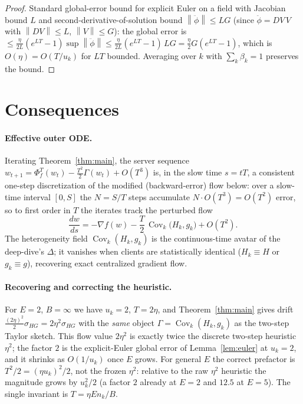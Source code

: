 \documentclass[11pt]{article}
\theoremstyle{definition}
\newcommand{\norm}[1]{\left\lVert#1\right\rVert}
\newcommand{\grad}{\nabla}
\newcommand{\Cov}{\operatorname{Cov}}
\begin{document}
\begin{proof}
Standard global-error bound for explicit Euler on a field with Jacobian bound
$L$ and second-derivative-of-solution bound $\norm{\ddot\phi}\le LG$ (since
$\ddot\phi=DV\,V$ with $\norm{DV}\le L$, $\norm{V}\le G$): the global error is
$\le \tfrac{\eta}{2L}(e^{LT}-1)\sup\norm{\ddot\phi}\le\tfrac{\eta}{2L}(e^{LT}-1)\,LG
=\tfrac{\eta}{2}G(e^{LT}-1)$, which is $O(\eta)=O(T/u_k)$ for $LT$ bounded.
Averaging over $k$ with $\sum_k\beta_k=1$ preserves the bound.
\end{proof}

\section{Consequences}

\paragraph{Effective outer ODE.} Iterating Theorem~\ref{thm:main}, the server
sequence $w_{t+1}=\Phi_f^{T}(w_t)-\tfrac{T^2}{2}\Gamma(w_t)+O(T^3)$ is, in the
slow time $s=tT$, a consistent one-step discretization of the modified
(backward-error) flow below: over a slow-time interval $[0,S]$ the $N=S/T$ steps
accumulate $N\cdot O(T^3)=O(T^2)$ error, so to first order in $T$ the iterates
track the perturbed flow
\[
\frac{dw}{ds}=-\grad f(w)-\frac{T}{2}\,\Cov_k\big(H_k,g_k\big)+O(T^2).
\]
The heterogeneity field $\Cov_k(H_k,g_k)$ is the continuous-time avatar of the
deep-dive's $\Delta$; it vanishes when clients are statistically identical
($H_k\equiv H$ or $g_k\equiv g$), recovering exact centralized gradient flow.

\paragraph{Recovering and correcting the heuristic.} For $E=2$, $B=\infty$ we
have $u_k=2$, $T=2\eta$, and Theorem~\ref{thm:main} gives drift
$\tfrac{(2\eta)^2}{2}\sigma_{HG}=2\eta^2\sigma_{HG}$ with the \emph{same} object
$\Gamma=\Cov_k(H_k,g_k)$ as the two-step Taylor sketch. This flow value
$2\eta^2$ is exactly twice the discrete two-step heuristic $\eta^2$; the factor
$2$ is the explicit-Euler global error of Lemma~\ref{lem:euler} at $u_k=2$, and it
shrinks as $O(1/u_k)$ once $E$ grows. For general $E$ the correct prefactor is
$T^2/2=(\eta u_k)^2/2$, not the frozen $\eta^2$: relative to the raw $\eta^2$
heuristic the magnitude grows by $u_k^2/2$ (a factor $2$ already at $E=2$ and
$12.5$ at $E=5$). The single invariant is $T=\eta E n_k/B$.
\end{document}
